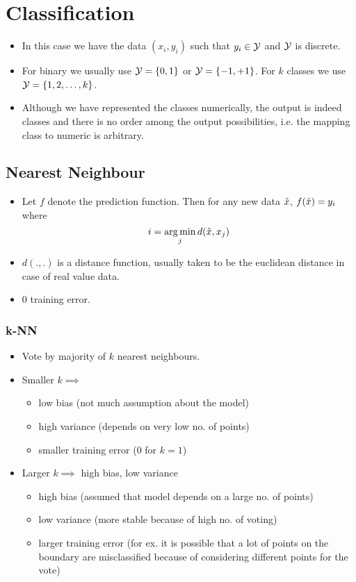 \documentclass{article}
\begin{document}
\section{Classification}

\begin{itemize}
    \item In this case we have the data $(x_i,y_i)$ such that $y_i \in \mathcal{Y}$ and $\mathcal{Y}$ is discrete.
    \item For binary we usually use $\mathcal{Y}=\{0,1\}$ or $\mathcal{Y}=\{-1, +1\}$. For $k$ classes we use $\mathcal{Y} = \{1,2,\dots,k\}$.
    \item Although we have represented the classes numerically, the output is indeed classes and there is no order among the output possibilities, i.e. the mapping class to numeric is arbitrary.
\end{itemize}

\subsection{Nearest Neighbour}
\begin{itemize}
    \item Let $f$ denote the prediction function. Then for any new data $\hat{x}$, $f(\hat{x}) = y_i$ where $$i=\operatorname*{arg\,min}_j d(\hat{x}, x_j)$$
    \item $d(.,.)$ is a distance function, usually taken to be the euclidean distance in case of real value data.
    \item 0 training error.
\end{itemize}
\subsubsection{k-NN}
\begin{itemize}
    \item Vote by majority of $k$ nearest neighbours.
    \item Smaller $k \implies$ 
        \begin{itemize}
            \item low bias (not much assumption about the model)
            \item high variance (depends on very low no. of points)
            \item smaller training error (0 for $k=1$)
        \end{itemize}
    \item Larger $k \implies$ high bias, low variance
        \begin{itemize}
            \item high bias (assumed that model depends on a large no. of points)
            \item low variance (more stable because of high no. of voting)
            \item larger training error (for ex. it is possible that a lot of points on the boundary are misclassified because of considering different points for the vote)
        \end{itemize}
\end{itemize}
\end{document}
